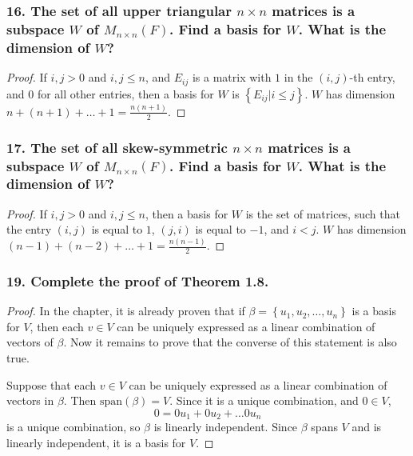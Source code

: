 \documentclass{article}
\begin{document}
\subsubsection*{16. The set of all upper triangular $n \times n$ matrices is a subspace $W$ of $M_{n\times n}(F)$. Find a basis for $W$. What is the dimension of $W$?}

\begin{proof}
	If $i, j > 0$ and $i, j \le n$, and $E_{ij}$ is a matrix with $1$ in the $(i,j)$-th entry, and $0$ for all other entries, then a basis for $W$ is $\left\{E_{ij} | i \le j\right\}$. $W$ has dimension $n + (n+1) + \dots + 1 = \frac{n(n+1)}{2}$.
\end{proof}

\subsubsection*{17. The set of all skew-symmetric $n\times n$ matrices is a subspace $W$ of $M_{n\times n}(F)$. Find a basis for $W$. What is the dimension of $W$?}

\begin{proof}
	If $i, j > 0$ and $i, j \le n$, then a basis for $W$ is the set of matrices, such that the entry $(i, j)$ is equal to $1$, $(j, i)$ is equal to $-1$, and $i < j$. $W$ has dimension $(n-1) + (n-2) + \dots + 1 = \frac{n(n-1)}{2}$.
\end{proof}

\subsubsection*{19. Complete the proof of Theorem 1.8.}

\begin{proof}
	In the chapter, it is already proven that if $\beta = \left\{u_1, u_2, \dots, u_n\right\}$ is a basis for $V$, then each $v \in V$ can be uniquely expressed as a linear combination of vectors of $\beta$. Now it remains to prove that the converse of this statement is also true.

	Suppose that each $v \in V$ can be uniquely expressed as a linear combination of vectors in $\beta$. Then $\text{span}(\beta) = V$. Since it is a unique combination, and $0 \in V$, \[ 0 = 0u_1 + 0u_2 + \dots 0u_n \] is a unique combination, so $\beta$ is linearly independent. Since $\beta$ spans $V$ and is linearly independent, it is a basis for $V$.
\end{proof}
\end{document}
